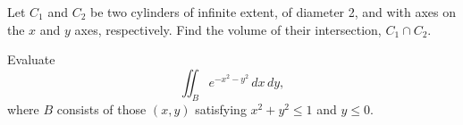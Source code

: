 \documentclass[openany]{book}
\begin{document}
\begin{prob}[8]
    Let \( C_1 \) and \( C_2 \) be two cylinders of infinite extent, of diameter 2, and with axes on the \( x \) and \( y \) axes, respectively. Find the volume of their intersection, \( C_1 \cap C_2 \).
\end{prob}

\begin{prob}[22]
    Evaluate
    \[
    \iint_{B} e^{-x^2-y^2} \, dx \, dy,
    \]
    where \( B \) consists of those \( (x, y) \) satisfying \( x^2 + y^2 \leq 1 \) and \( y \leq 0 \).
\end{prob}
\end{document}
